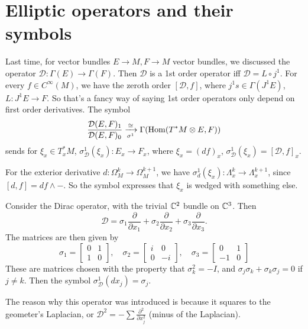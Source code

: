 \section{Elliptic operators and their symbols} 
Last time, for vector bundles $E \to M, F\to M$ vector bundles, we discussed the operator $\mathcal D \colon \Gamma(E) \to \Gamma(F)$. Then $\mathcal D$ is a 1st order operator iff $\mathcal D = L \circ j^1$. For every $f \in C ^{\infty}(M)$, we have the zeroth order $[\mathcal D,f]$, where $j^1 s \in \Gamma (J^1 E)$, $L \colon J^1 E  \to F$. So that's a fancy way of saying 1st order operators only depend on first order derivatives. The symbol \[
    \frac{\mathcal D(E,F)_1}{\mathcal D(E,F)_0} \xrightarrow[\sigma^1]{\cong } \Gamma (\operatorname{Hom}(T^*M\otimes E,F))
\] sends for $\xi_x \in T_x^* M$, $\sigma^1_{\mathcal D}(\xi_x) \colon E_x \to F_x$, where $\xi_x = (df)_x$, $\sigma^1_{\mathcal D}(\xi_x) = [\mathcal D, f]_x$. 
\begin{example}
    For the exterior derivative $d \colon \Omega^k_M \to \Omega^{k+1}_M$, we have $\sigma^1_d(\xi_x) \colon \Lambda^k_x  \to \Lambda^{k+1}_x$, since $[d,f] = df \wedge -$. So the symbol expresses that  $\xi_x $ is wedged with something else.
\end{example}
\begin{example}
    Consider the Dirac operator, with the trivial $\mathbb{C}^2$ bundle on $\mathbb{C}^3$. Then \[
    \mathcal D = \sigma_1 \frac{\partial }{\partial x_1}+ \sigma_2 \frac{\partial }{\partial x_2}+ \sigma_3 \frac{\partial }{\partial x_3}.
    \] The matrices are then given by \[
    \sigma_1 = 
    \begin{bmatrix}
        0 & 1 \\ 1 & 0
    \end{bmatrix},\quad 
    \sigma_2 = 
    \begin{bmatrix}
        i & 0 \\ 0 & -i 
    \end{bmatrix}, \quad
    \sigma_3 = 
    \begin{bmatrix}
        0 & 1 \\ -1 & 0 
    \end{bmatrix}
\] These are matrices chosen with the property that $\sigma_k ^2 = -I$, and $\sigma_j \sigma_k + \sigma_k \sigma_j  = 0$ if $j\neq k$. Then the symbol $\sigma^1_{\mathcal D}(dx_j ) = \sigma_j $.
\end{example}
The reason why this operator was introduced is because it squares to the geometer's Laplacian, or $\mathcal D^2 = -\sum \frac{\partial ^2}{\partial x_j ^2}$ (minus of the Laplacian). 
